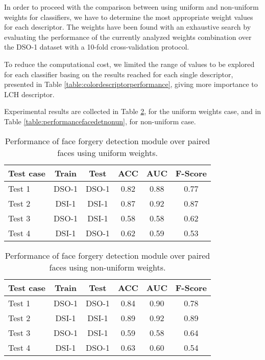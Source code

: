 In order to proceed with the comparison between using uniform and non-uniform weights for classifiers, we have to determine the most appropriate weight values for each descriptor. The weights have been found with an exhaustive search by evaluating the performance of the currently analyzed weights combination over the DSO-1 dataset with a 10-fold cross-validation protocol. 

To reduce the computational cost, we limited the range of values to be explored for each classifier basing on the results reached for each single descriptor, presented in Table \ref{table:colordescriptorperformance}, giving more importance to LCH descriptor.

Experimental results are collected in Table \ref{table:performancefacedet}, for the uniform weights case, and in Table \ref{table:performancefacedetnonun}, for non-uniform case. 

\begin{table}[h!]
\centering
\begin{tabular}{l c c c c c} 
\hline \hline 
\textbf{Test case} & \textbf{Train} & \textbf{Test} & \textbf{ACC} & \textbf{AUC} &\textbf{ F-Score} \\ [0.5ex]
\hline
Test 1 & DSO-1 & DSO-1 &	0.82 & 0.88	& 0.77\\
Test 2 & DSI-1 & DSI-1 &	0.87 & 0.92 & 0.87\\
Test 3 &	DSO-1 &	DSI-1 &	0.58 & 0.58 & 0.62\\
Test 4 &	DSI-1 & DSO-1 & 0.62 & 0.59 & 0.53\\ [1ex]
\hline
\end{tabular}
\caption{Performance of face forgery detection module over paired faces using uniform weights.}
\label{table:performancefacedet}
\end{table}

\begin{table}[h!]
\centering
\begin{tabular}{l c c c c c} 
\hline \hline 
\textbf{Test case} & \textbf{Train} & \textbf{Test} & \textbf{ACC} & \textbf{AUC} &\textbf{ F-Score} \\ [0.5ex]
\hline
Test 1 & DSO-1 & DSO-1 &	0.84 & 0.90	& 0.78\\
Test 2 & DSI-1 & DSI-1 &	0.89 & 0.92 & 0.89\\
Test 3 &	DSO-1 &	DSI-1 &	0.59 & 0.58 & 0.64\\
Test 4 &	DSI-1 & DSO-1 & 0.63 & 0.60 & 0.54\\ [1ex]
\hline
\end{tabular}
\caption{Performance of face forgery detection module over paired faces using non-uniform weights.}
\label{table:performancefacedet}
\end{table}

